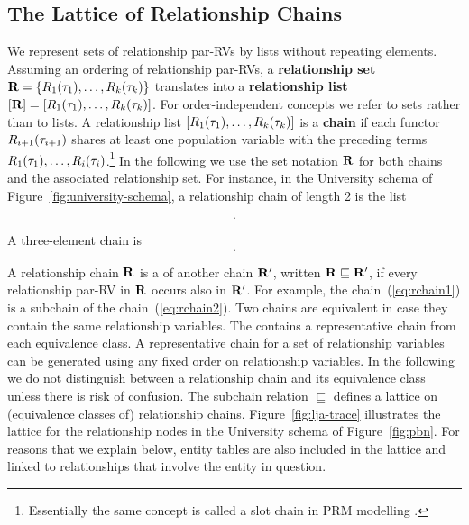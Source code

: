 \subsection{The Lattice of Relationship Chains} 
We represent sets of relationship par-RVs by lists without repeating elements. Assuming an ordering of relationship par-RVs, a \textbf{relationship set} $\mathbf{R} = \{R_{1}(\mathbf{\tau}_{1}),\ldots,R_{k}(\mathbf{\tau}_{k})\}$ translates into a \textbf{relationship list} $[\mathbf{R}]=[R_{1}(\mathbf{\tau}_{1}),\ldots,R_{k}(\mathbf{\tau}_{k})]$. For order-independent concepts we refer to sets rather than to lists.
A relationship list $[R_{1}(\mathbf{\tau}_{1}),\ldots,R_{k}(\mathbf{\tau}_{k})]$ is a \textbf{chain} if each functor $R_{i+1}(\mathbf{\tau}_{i+1})$ shares at least one population variable with the preceding terms $R_{1}(\mathbf{\tau}_{1}),\ldots,R_{i}(\mathbf{\tau}_{i})$.\footnote{Essentially the same concept is called a slot chain in PRM modelling \cite{Getoor2007c}.} In the following we use the set notation $\mathbf{R}$ for both chains and the associated relationship set. %
For instance, in the University schema of Figure~\ref{fig:university-schema}, a relationship 
chain of length 2 is the list 

\begin{equation}
[\it{RA}(\P,\S),\it{Registered}(\S,\C)]. \label{eq:rchain1}
\end{equation} 

A three-element chain is 
\begin{equation}
[\it{RA}(\P,\S),\it{Registered}(\S,\C),\it{TA}(\C,S)]. \label{eq:rchain2}
\end{equation}

 A relationship chain $\mathbf{R}$ is a  of another chain $\mathbf{R'}$, written $\mathbf{R} \sqsubseteq \mathbf{R'}$, if every relationship par-RV in $\mathbf{R}$ occurs also in $\mathbf{R'}$. For example, the chain~(\ref{eq:rchain1}) is a subchain of the chain~(\ref{eq:rchain2}).
Two chains are equivalent in case they contain the same relationship variables. 
The  contains a representative chain from each equivalence class. A representative chain for a set of relationship variables can be generated using any fixed order on relationship variables. In the following we do not distinguish between a relationship chain and its equivalence class unless there is risk of confusion.  The
subchain relation $\sqsubseteq$ defines a lattice on (equivalence classes of) relationship chains. Figure~\ref{fig:lja-trace} illustrates the  lattice for the relationship nodes in the University schema of Figure~\ref{fig:pbn}. For reasons that we explain below, entity tables are also included in the lattice and linked to relationships that involve the entity in question. 




